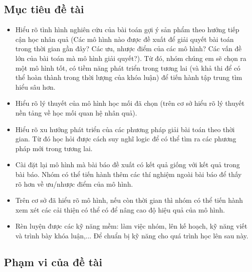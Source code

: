 \documentclass{article}[14pt]
\begin{document}
{    \subsection{Mục tiêu đề tài}
    \begin{itemize}
        \item Hiểu rõ tình hình nghiên cứu của bài toán gợi ý sản phẩm theo hướng tiếp cận học nhân quả (Các mô hình nào được đề xuất để giải quyết bài toán trong thời gian gần đây? Các ưu, nhược điểm của các mô hình? Các vấn đề lớn của bài toán mà mô hình giải quyết?). Từ đó, nhóm chúng em sẽ chọn ra một mô hình tốt, có tiềm năng phát triển trong tương lai (và khả thi để có thể hoàn thành trong thời lượng của khóa luận) để tiến hành tập trung tìm hiểu sâu hơn.
        \item Hiểu rõ lý thuyết của mô hình học mối đã chọn (trên cơ sở hiểu rõ lý thuyết nền tảng về học mối quan hệ nhân quả).
        \item Hiểu rõ xu hướng phát triển của các phương pháp giải bài toán theo thời gian. Từ đó học hỏi được cách suy nghĩ logic để có thể tìm ra các phương pháp mới trong tương lai.
        \item Cài đặt lại mô hình mà bài báo đề xuất có kết quả giống với kết quả trong bài báo. Nhóm có thể tiến hành thêm các thí nghiệm ngoài bài báo để thấy rõ hơn về ưu/nhược điểm của mô hình.
        \item Trên cơ sở đã hiểu rõ mô hình, nếu còn thời gian thì nhóm có thể tiến hành xem xét các cải thiện có thể có để nâng cao độ hiệu quả của mô hình.
        \item Rèn luyện được các kỹ năng mềm: làm việc nhóm, lên kế hoạch, kỹ năng viết và trình bày khóa luận,... Để chuẩn bị kỹ năng cho quá trình học lên sau này.

    \end{itemize}{}
    
    \subsection{Phạm vi của đề tài}
    
}
\end{document}
